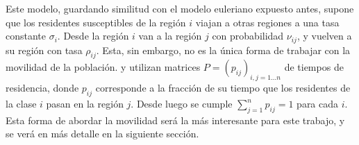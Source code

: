 Este modelo, guardando similitud con el modelo euleriano expuesto antes, supone que los residentes susceptibles de la región \(i\) viajan a otras regiones a una tasa constante \(\sigma_i\). Desde la región \(i\) van a la región \(j\) con probabilidad \(\nu_{ij}\), y vuelven a su región con tasa \(\rho_{ij}\). Esta, sin embargo, no es la única forma de trabajar con la movilidad de la población. \cite{Cosner2009} y \cite{Bichara2015} utilizan matrices \(P = (p_{ij})_{i, j = 1 \dots n}\) de tiempos de residencia, donde \(p_{ij}\) corresponde a la fracción de su tiempo que los residentes de la clase \(i\) pasan en la región \(j\). Desde luego se cumple \(\sum_{j = 1}^n p_{ij} = 1\) para cada \(i\). Esta forma de abordar la movilidad será la más interesante para este trabajo, y se verá en más detalle en la siguiente sección.




